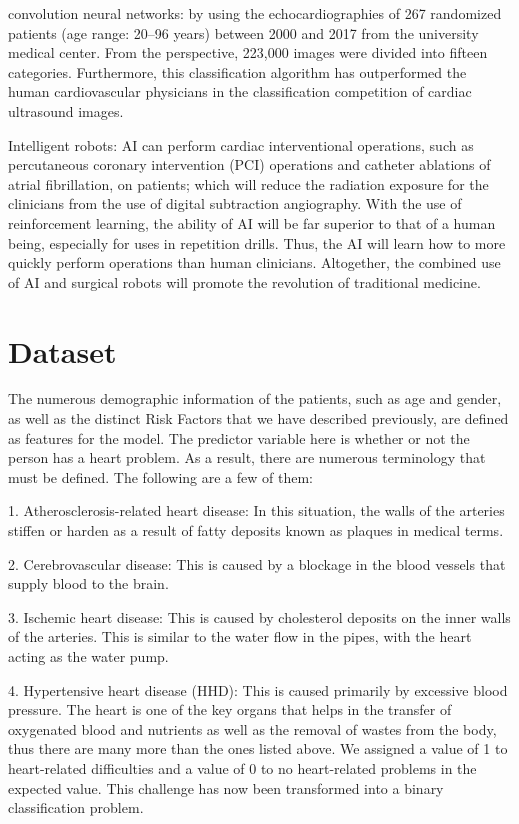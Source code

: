\documentclass{article}
\begin{document}
convolution neural networks:
by using the echocardiographies of 267 randomized patients (age range: 20–96 years) between 2000 and 2017 from the university medical center. From the perspective, 223,000 images were divided into fifteen categories. Furthermore, this classification algorithm has outperformed the human cardiovascular physicians in the classification competition of cardiac ultrasound images.

Intelligent robots:
AI can perform cardiac interventional operations, such as percutaneous coronary intervention (PCI) operations and catheter ablations of atrial fibrillation, on patients; which will reduce the radiation exposure for the clinicians from the use of digital subtraction angiography. With the use of reinforcement learning, the ability of AI will be far superior to that of a human being, especially for uses in repetition drills. Thus, the AI will learn how to more quickly perform operations than human clinicians. Altogether, the combined use of AI and surgical robots will promote the revolution of traditional medicine.

\section{Dataset}
The numerous demographic information of the patients, such as age and gender, as well as the distinct Risk Factors that we have described previously, are defined as features for the model. The predictor variable here is whether or not the person has a heart problem. As a result, there are numerous terminology that must be defined. The following are a few of them:

1. Atherosclerosis-related heart disease: 
In this situation, the walls of the arteries stiffen or harden as a result of fatty deposits known as plaques in medical terms.

2. Cerebrovascular disease: 
This is caused by a blockage in the blood vessels that supply blood to the brain.

3. Ischemic heart disease: 
This is caused by cholesterol deposits on the inner walls of the arteries. This is similar to the water flow in the pipes, with the heart acting as the water pump.

4. Hypertensive heart disease (HHD): 
This is caused primarily by excessive blood pressure. The heart is one of the key organs that helps in the transfer of oxygenated blood and nutrients as well as the removal of wastes from the body, thus there are many more than the ones listed above. We assigned a value of 1 to heart-related difficulties and a value of 0 to no heart-related problems in the expected value. This challenge has now been transformed into a binary classification problem.
\end{document}

